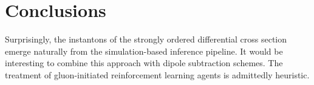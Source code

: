 \section{Conclusions}\label{sec:conclusions}

Surprisingly, the instantons of the strongly ordered differential cross
section emerge naturally from the simulation-based inference pipeline.
It would be interesting to combine this approach with dipole subtraction
schemes. The treatment of gluon-initiated reinforcement learning agents
is admittedly heuristic.

